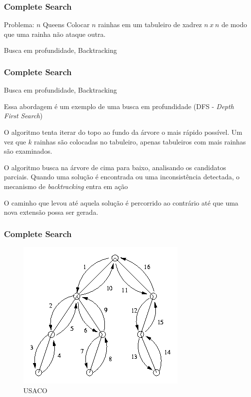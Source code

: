 \begin{frame}
\frametitle{Complete Search}
\begin{block}{Problema: $n$ Queens}
\scriptsize
Colocar $n$ rainhas em um tabuleiro de xadrez $n\ x\ n$ de modo que uma rainha não ataque outra.
\end{block}

\begin{block}{Busca em profundidade, Backtracking}
\end{block}
\end{frame}

\begin{frame}
\frametitle{Complete Search}

\begin{block}{Busca em profundidade, Backtracking}

\begin{itemize}
	\bitem Essa abordagem é um exemplo de uma busca em profundidade (DFS - \emph{Depth First Search})
	\begin{itemize}
		\bitem O algoritmo tenta iterar do topo ao fundo da árvore o mais rápido possível.
		\bitem Um vez que $k$ rainhas são colocadas no tabuleiro, apenas tabuleiros com mais rainhas são examinados.
	\end{itemize}
	\bitem O algoritmo busca na árvore de cima para baixo, analisando os candidatos parciais.
	\bitem Quando uma solução é encontrada ou uma inconsistência detectada, o mecanismo de \emph{backtracking} entra em ação
	\begin{itemize}
		\bitem O caminho que levou até aquela solução é percorrido ao contrário até que uma nova extensão possa ser gerada.
	\end{itemize}
\end{itemize}
\end{block}
\end{frame}

\begin{frame}
\frametitle{Complete Search}
	\begin{center}
		\begin{figure}
			\includegraphics[width=.52\textwidth]{figuras/dfs.png}
			\caption{USACO}
		\end{figure}
	\end{center}
\end{frame}

